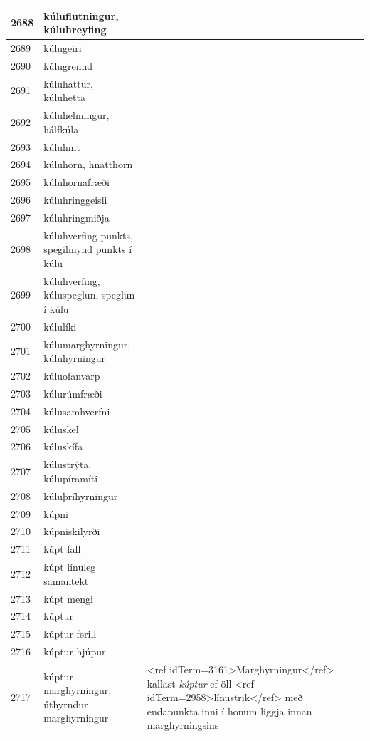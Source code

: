 \begin{longtable}{p{}|p{}|p{}|p{}|p{}}
\hline
2688 & kúluflutningur, kúluhreyfing &  &  &  \\
\hline
2689 & kúlugeiri &  &  &  \\
\hline
2690 & kúlugrennd &  &  &  \\
\hline
2691 & kúluhattur, kúluhetta &  &  &  \\
\hline
2692 & kúluhelmingur, hálfkúla &  &  &  \\
\hline
2693 & kúluhnit &  &  &  \\
\hline
2694 & kúluhorn, hnatthorn &  &  &  \\
\hline
2695 & kúluhornafræði &  &  &  \\
\hline
2696 & kúluhringgeisli &  &  &  \\
\hline
2697 & kúluhringmiðja &  &  &  \\
\hline
2698 & kúluhverfing punkts, spegilmynd punkts í kúlu &  &  &  \\
\hline
2699 & kúluhverfing, kúluspeglun, speglun í kúlu &  &  &  \\
\hline
2700 & kúlulíki &  &  &  \\
\hline
2701 & kúlumarghyrningur, kúluhyrningur &  &  &  \\
\hline
2702 & kúluofanvarp &  &  &  \\
\hline
2703 & kúlurúmfræði &  &  &  \\
\hline
2704 & kúlusamhverfni &  &  &  \\
\hline
2705 & kúluskel &  &  &  \\
\hline
2706 & kúluskífa &  &  &  \\
\hline
2707 & kúlustrýta, kúlupíramíti &  &  &  \\
\hline
2708 & kúluþríhyrningur &  &  &  \\
\hline
2709 & kúpni &  &  &  \\
\hline
2710 & kúpniskilyrði &  &  &  \\
\hline
2711 & kúpt fall &  &  &  \\
\hline
2712 & kúpt línuleg samantekt &  &  &  \\
\hline
2713 & kúpt mengi &  &  &  \\
\hline
2714 & kúptur &  &  &  \\
\hline
2715 & kúptur ferill &  &  &  \\
\hline
2716 & kúptur hjúpur &  &  &  \\
\hline
2717 & kúptur marghyrningur, úthyrndur marghyrningur & <ref idTerm=3161>Marghyrningur</ref> kallast \textit{kúptur} ef öll <ref idTerm=2958>línustrik</ref> með endapunkta inni í honum liggja innan marghyrningsins &  &  \\

\end{longtable}
